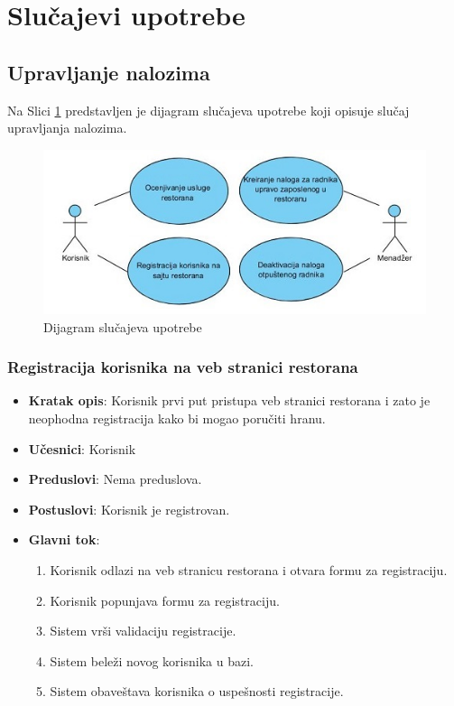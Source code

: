 \newpage
\section{Slu\v cajevi upotrebe}
\subsection{Upravljanje nalozima}

Na Slici \ref{fig:slika_nalozi} predstavljen je dijagram slučajeva upotrebe koji opisuje slučaj upravljanja nalozima.

\begin{figure}[!h]
    \includegraphics[width=1\textwidth]{slike/Upravljanje_nalozima.JPG}
    \caption{Dijagram slučajeva upotrebe}
    \label{fig:slika_nalozi}
\end{figure}

\subsubsection{Registracija korisnika na veb stranici restorana}

\begin{itemize}
    \item \textbf{Kratak opis}:
    Korisnik prvi put pristupa veb stranici restorana i zato je neophodna registracija kako bi mogao poručiti hranu.
    \item \textbf{Učesnici}:
    Korisnik
    \item \textbf{Preduslovi}:
    Nema preduslova. 
    \item \textbf{Postuslovi}:
    Korisnik je registrovan. 
    \item \textbf{Glavni tok}:
    \begin{enumerate}
        \item Korisnik odlazi na veb stranicu restorana i otvara formu za registraciju.
        \item Korisnik popunjava formu za registraciju.
        \item Sistem vrši validaciju registracije.
        \item Sistem beleži novog korisnika u bazi.
        \item Sistem obaveštava korisnika o uspešnosti registracije.
    \end{enumerate}
\end{itemize}



